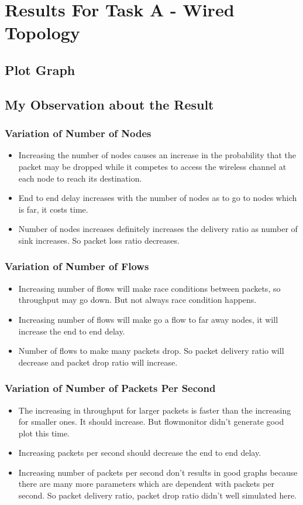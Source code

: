\documentclass[12pt, a4paper]{article}
\begin{document}
\section{Results For Task A - Wired Topology}
\subsection{Plot Graph}

\subsection{My Observation about the Result}
\subsubsection{Variation of Number of Nodes}
\begin{itemize}
    \item Increasing the number of nodes causes an increase in the probability that the packet may be dropped while it competes to access the wireless channel at each node to reach its destination.
    \item End to end delay increases with the number of nodes as to go to nodes which is far, it costs time.
    \item Number of nodes increases definitely increases the delivery ratio as number of sink increases. So packet loss ratio decreases.
\end{itemize}
\subsubsection{Variation of Number of Flows}
\begin{itemize}
    \item Increasing number of flows will make race conditions between packets, so throughput may go down. But not always race condition happens.
    \item Increasing number of flows will make go a flow to far away nodes, it will increase the end to end delay.
    \item Number of flows to make many packets drop. So packet delivery ratio will decrease and packet drop ratio will increase.
\end{itemize}
\subsubsection{Variation of Number of Packets Per Second}
\begin{itemize}
    \item The increasing in throughput for larger packets is faster than the increasing for smaller ones. It should increase. But flowmonitor didn't generate good plot this time.
    \item Increasing packets per second should decrease the end to end delay.
    \item Increasing number of packets per second don't results in good graphs because there are many more parameters which are dependent with packets per second. So packet delivery ratio, packet drop ratio didn't well simulated here.
\end{itemize}
\end{document}
